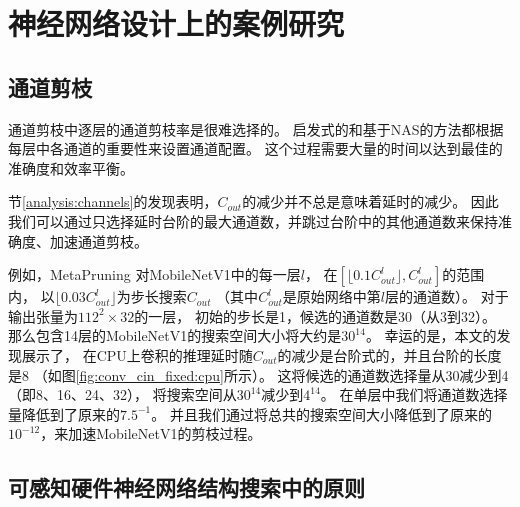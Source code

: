 \section{神经网络设计上的案例研究}

\subsection{通道剪枝}
通道剪枝中逐层的通道剪枝率是很难选择的。
启发式的和基于NAS的方法都根据每层中各通道的重要性来设置通道配置。
这个过程需要大量的时间以达到最佳的准确度和效率平衡。

节\ref{analysis:channels}的发现表明，$C_{out}$的减少并不总是意味着延时的减少。
因此我们可以通过只选择延时台阶的最大通道数，并跳过台阶中的其他通道数来保持准确度、加速通道剪枝。

例如，MetaPruning\cite{liu2019metapruning}
对MobileNetV1中的每一层$l$，
在$[\lfloor 0.1C_{out}^l \rfloor, C_{out}^l]$的范围内，
以$\lfloor 0.03C_{out}^l \rfloor$为步长搜索$C_{out}$
（其中$C_{out}^l$是原始网络中第$l$层的通道数）。
对于输出张量为$112^2\times 32$的一层，
初始的步长是1，候选的通道数是30（从3到32）。
那么包含14层的MobileNetV1的搜索空间大小将大约是$30^{14}$。
幸运的是，本文的发现展示了，
在CPU上卷积的推理延时随$C_{out}$的减少是台阶式的，并且台阶的长度是8
（如图\ref{fig:conv_cin_fixed:cpu}所示）。
这将候选的通道数选择量从30减少到4（即8、16、24、32），
将搜索空间从$30^{14}$减少到$4^{14}$。
在单层中我们将通道数选择量降低到了原来的$7.5^{-1}$。
并且我们通过将总共的搜索空间大小降低到了原来的$10^{-12}$，来加速MobileNetV1的剪枝过程。

\subsection{可感知硬件神经网络结构搜索中的原则}